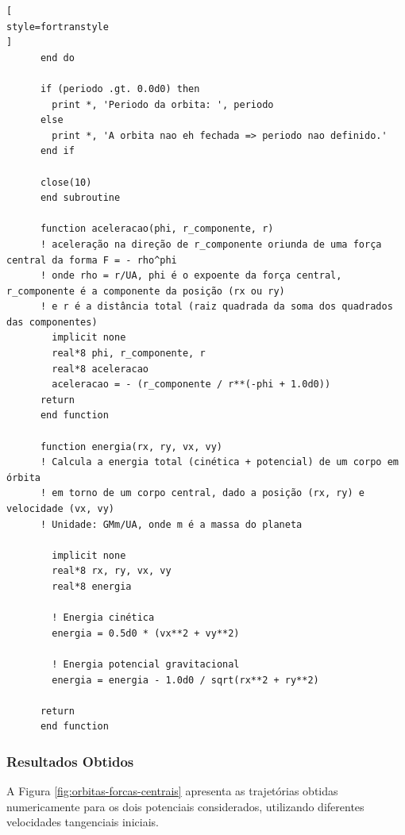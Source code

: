 \documentclass[12pt,a4paper]{article}
\begin{document}
\begin{lstlisting}[
style=fortranstyle
]
      end do

      if (periodo .gt. 0.0d0) then
        print *, 'Periodo da orbita: ', periodo
      else
        print *, 'A orbita nao eh fechada => periodo nao definido.'
      end if

      close(10)
      end subroutine

      function aceleracao(phi, r_componente, r)
      ! aceleração na direção de r_componente oriunda de uma força central da forma F = - rho^phi 
      ! onde rho = r/UA, phi é o expoente da força central, r_componente é a componente da posição (rx ou ry)
      ! e r é a distância total (raiz quadrada da soma dos quadrados das componentes)
        implicit none
        real*8 phi, r_componente, r
        real*8 aceleracao
        aceleracao = - (r_componente / r**(-phi + 1.0d0))
      return
      end function

      function energia(rx, ry, vx, vy)
      ! Calcula a energia total (cinética + potencial) de um corpo em órbita
      ! em torno de um corpo central, dado a posição (rx, ry) e velocidade (vx, vy)
      ! Unidade: GMm/UA, onde m é a massa do planeta
      
        implicit none
        real*8 rx, ry, vx, vy
        real*8 energia

        ! Energia cinética
        energia = 0.5d0 * (vx**2 + vy**2)

        ! Energia potencial gravitacional
        energia = energia - 1.0d0 / sqrt(rx**2 + ry**2)

      return
      end function
\end{lstlisting}


\subsubsection{Resultados Obtidos}

A Figura \ref{fig:orbitas-forcas-centrais} apresenta as trajetórias obtidas numericamente para os dois potenciais considerados, utilizando diferentes velocidades tangenciais iniciais.
\end{document}
